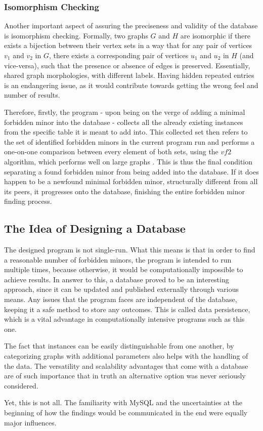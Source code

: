 \subsubsection{Isomorphism Checking}
Another important aspect of assuring the preciseness and validity of the database is isomorphism checking. Formally, two graphs $G$ and $H$ are isomorphic if there exists a bijection between their vertex sets in a way that for any pair of vertices $v_1$ and $v_2$ in $G$, there exists a corresponding pair of vertices $u_1$ and $u_2$ in $H$ (and vice-versa), such that the presence or absence of edges is preserved. Essentially, shared graph morphologies, with different labels. Having hidden repeated entries is an endangering issue, as it would contribute towards getting the wrong feel and number of results. 

Therefore, firstly, the program - upon being on the verge of adding a minimal forbidden minor into the database - collects all the already existing instances from the specific table it is meant to add into. This collected set then refers to the set of identified forbidden minors in the current program run and performs a one-on-one comparison between every element of both sets, using the $vf2$ algorithm, which performs well on large graphs \cite{foggia2001}. This is thus the final condition separating a found forbidden minor from being added into the database. If it does happen to be a newfound minimal forbidden minor, structurally different from all its peers, it progresses onto the database, finishing the entire forbidden minor finding process.

\subsection{The Idea of Designing a Database}
The designed program is not single-run. What this means is that in order to find a reasonable number of forbidden minors, the program is intended to run multiple times, because otherwise, it would be computationally impossible to achieve results. In answer to this, a database proved to be an interesting approach, since it can be updated and published externally through various means. Any issues that the program faces are independent of the database, keeping it a safe method to store any outcomes. This is called data persistence, which is a vital advantage in computationally intensive programs such as this one.

The fact that instances can be easily distinguishable from one another, by categorizing graphs with additional parameters also helps with the handling of the data. The versatility and scalability advantages that come with a database are of such importance that in truth an alternative option was never seriously considered.

Yet, this is not all. The familiarity with MySQL and the uncertainties at the beginning of how the findings would be communicated in the end were equally major influences.
